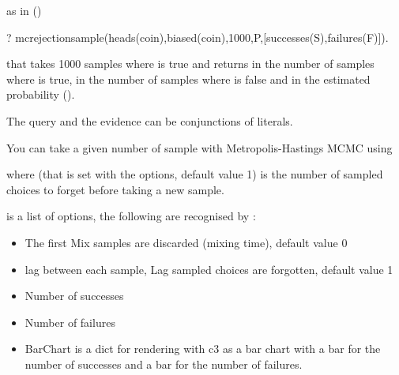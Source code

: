\documentclass[letterpaper,10pt,english]{sphinxmanual}
\begin{document}
as in ()

\begin{sphinxVerbatim}[commandchars=\\\{\}]
?\PYGZhy{} mc\PYGZus{}rejection\PYGZus{}sample(heads(coin),biased(coin),1000,P,[successes(S),failures(F)]).
\end{sphinxVerbatim}

that takes 1000 samples where  is true and returns in  the number of samples where  is true, in  the number of samples where  is false and in  the estimated probability ().

The query and the evidence can be conjunctions of literals.

You can take a given number of sample with Metropolis-Hastings MCMC using

\begin{sphinxVerbatim}[commandchars=\\\{\}]
  
\end{sphinxVerbatim}

where  (that is set with the options, default value 1) is the number of sampled choices to forget before taking a new sample.

 is a list of options, the following are recognised by :
\begin{itemize}
\item {} 
 The first Mix samples are discarded (mixing time), default value 0

\item {} 
 lag between each sample, Lag sampled choices are forgotten, default value 1

\item {} 
 Number of successes

\item {} 
 Number of failures

\item {} 
 BarChart is a dict for rendering with c3 as a bar chart with a bar for the number of successes and a bar for the number of failures.

\end{itemize}
\end{document}
